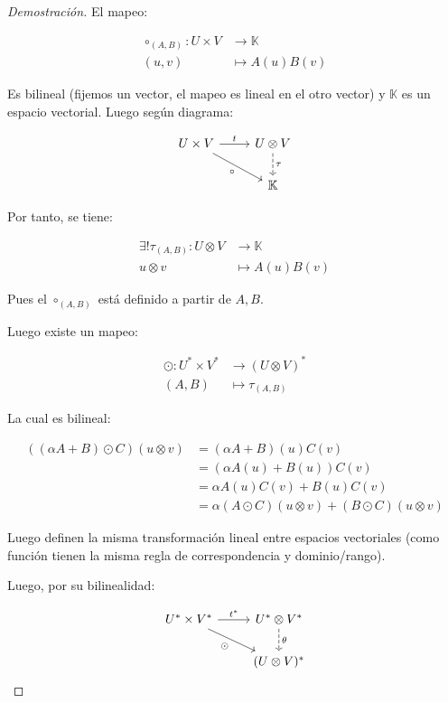 \begin{proof}[Demostración]
	El mapeo:
	
	\begin{align*}
		\circ_{(A,B)} :  U\times V &\to \mathbb{K} \\
		(u,v) &\mapsto A(u)B(v)
	\end{align*}
	
	Es bilineal (fijemos un vector, el mapeo es lineal en el otro vector) y $\mathbb{K}$ es un espacio vectorial. Luego según diagrama:
	
	\begin{equation*}
		\begin{tikzcd}
			U \times V \arrow[dr, "\circ"'] \arrow[r, "t"] & U \otimes V 	\arrow[d, dashed, "\tau"] \\
			& \mathbb{K}
		\end{tikzcd}
	\end{equation*}
	
	Por tanto, se tiene: 
	
	\begin{align*}
		\exists !\tau_{(A,B)} :  U\otimes V &\to \mathbb{K} \\
		u\otimes v &\mapsto A(u)B(v)
	\end{align*}
	
	Pues el $\circ_{(A,B)}$ está definido a partir de $A,B$.
	
	Luego existe un mapeo:
	
	\begin{align*}
		\odot : U^* \times V^* &\to  (U\otimes V)^* \\
		(A,B) &\mapsto \tau_{(A,B)} 
	\end{align*}
	
	La cual es bilineal:
	
	\begin{align*}
		((\alpha A+ B )\odot C )(u\otimes v) &= (\alpha A+ B )(u) C(v) \\
		&= (\alpha A(u)+ B(u) ) C(v) \\
		&= \alpha A(u)C(v) + B(u) C(v) \\
		&= \alpha (A\odot C)(u\otimes v) +  (B\odot C)(u\otimes v)
	\end{align*}
	
	Luego definen la misma transformación lineal entre espacios vectoriales (como función tienen  la misma regla de correspondencia y dominio/rango).
	
	Luego, por su bilinealidad:
	
	\begin{equation*}
		\begin{tikzcd}
			U^* \times V^* \arrow[dr, "\odot"'] \arrow[r, "t^*"] & U^* \otimes V^* \arrow[d, dashed, "\theta"] \\
			& (U \otimes V)^*
		\end{tikzcd}
	\end{equation*}
	

\end{proof}
